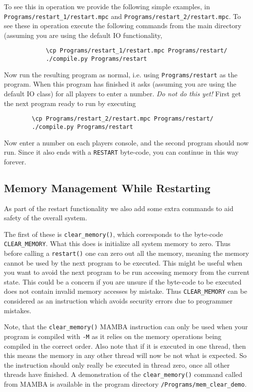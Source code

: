 To see this in operation we provide the following simple
examples, in \verb+Programs/restart_1/restart.mpc+
and \verb+Programs/restart_2/restart.mpc+.
To see these in operation execute the following commands
from the main directory (assuming you are using the
default IO functionality,
\begin{verbatim}
            \cp Programs/restart_1/restart.mpc Programs/restart/
            ./compile.py Programs/restart
\end{verbatim}
Now run the resulting program as normal, i.e. using \verb+Programs/restart+
as the program.
When this program has finished it asks (assuming you are
using the default IO class) for all players to enter
a number. {\em Do not do this yet!}
First get the next program ready to run by executing
\begin{verbatim}
        \cp Programs/restart_2/restart.mpc Programs/restart/
        ./compile.py Programs/restart
\end{verbatim}
Now enter a number on each players console, and 
the second program should now run.
Since it also ends with a \verb+RESTART+ byte-code, you can
continue in this way forever.

\subsection{Memory Management While Restarting}
As part of the restart functionality we also add some extra commands to aid
safety of the overall system.

The first of these is \verb+clear_memory()+, which corresponds to the byte-code
\verb+CLEAR_MEMORY+.
What this does is initialize all system memory to zero. Thus before calling a 
\verb+restart()+ one can zero out all the memory, meaning the memory cannot be
used by the next program to be executed. This might be useful when you want to
avoid the next program to be run accessing memory from the current state. This
could be a concern if you are unsure if the byte-code to be executed does not
contain invalid memory accesses by mistake. Thus \verb+CLEAR_MEMORY+ can be
considered as an instruction which avoids security errors due to programmer
mistakes.

Note, that the \verb+clear_memory()+ MAMBA instruction can only be used when your
program is compiled with \verb+-M+ as it relies on the memory operations being
compiled in the correct order.
Also note that if it is executed in one thread, then this means the memory
in any other thread will now be not what is expected. So the instruction 
should only really be executed in thread zero, once all other threads have
finished.
A demonstration of the \verb+clear_memory()+ command called from MAMBA is
available in the program directory \verb+/Programs/mem_clear_demo+.

